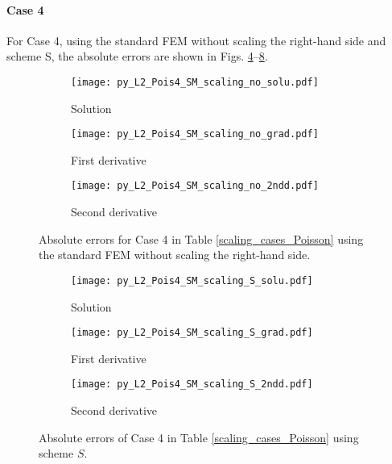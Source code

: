 \documentclass[review,3p]{elsarticle}
\begin{document}
\newpage
\paragraph{Case 4}
For Case 4, using the standard FEM without scaling the right-hand side and scheme S, the absolute errors are shown in Figs. \ref{py_L2_Pois4_SM_scaling_no}--\ref{py_L2_Pois4_SM_scaling_S}.

\begin{figure}[!ht]
    \begin{subfigure}{5.5cm}
        \texttt{[image: py\_L2\_Pois4\_SM\_scaling\_no\_solu.pdf]}
        \caption{Solution}
        \label{py_L2_Pois4_SM_scaling_no_solu}
    \end{subfigure}
    \hspace{-0.2cm}
    \begin{subfigure}{5.5cm}
        \texttt{[image: py\_L2\_Pois4\_SM\_scaling\_no\_grad.pdf]}
        \caption{First derivative}
        \label{py_L2_Pois4_SM_scaling_no_grad}
    \end{subfigure}
    \hspace{-0.2cm}
    \begin{subfigure}{5.5cm}
        \texttt{[image: py\_L2\_Pois4\_SM\_scaling\_no\_2ndd.pdf]}
        \caption{Second derivative}
        \label{py_L2_Pois4_SM_scaling_no_2ndd}
    \end{subfigure}
\caption{Absolute errors for Case 4 in Table \ref{scaling_cases_Poisson} using the standard FEM without scaling the right-hand side.}
\label{py_L2_Pois4_SM_scaling_no}
\end{figure}

\begin{figure}[!ht]
    \begin{subfigure}{5.5cm}
        \texttt{[image: py\_L2\_Pois4\_SM\_scaling\_S\_solu.pdf]}
        \caption{Solution}
        \label{py_L2_Pois4_SM_scaling_S_solu}
    \end{subfigure}
    \hspace{-0.2cm}
    \begin{subfigure}{5.5cm}
        \texttt{[image: py\_L2\_Pois4\_SM\_scaling\_S\_grad.pdf]}
        \caption{First derivative}
        \label{py_L2_Pois4_SM_scaling_S_grad}
    \end{subfigure}
    \hspace{-0.2cm}
    \begin{subfigure}{5.5cm}
        \texttt{[image: py\_L2\_Pois4\_SM\_scaling\_S\_2ndd.pdf]}
        \caption{Second derivative}
        \label{py_L2_Pois4_SM_scaling_S_2ndd}
    \end{subfigure}
\caption{Absolute errors of Case 4 in Table \ref{scaling_cases_Poisson} using scheme $S$.}
\label{py_L2_Pois4_SM_scaling_S}
\end{figure}
\end{document}
